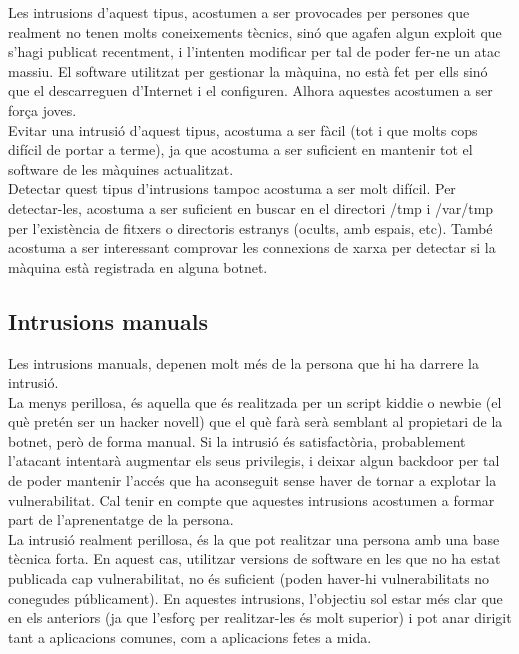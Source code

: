 Les intrusions d'aquest tipus, acostumen a ser provocades per persones que realment no tenen molts coneixements tècnics, sinó que 
agafen algun exploit que s'hagi publicat recentment, i l'intenten modificar per tal de poder fer-ne un atac massiu. El
software utilitzat per gestionar la màquina, no està fet per ells sinó que el descarreguen d'Internet i el configuren. Alhora
aquestes acostumen a ser força joves. \\

Evitar una intrusió d'aquest tipus, acostuma a ser fàcil (tot i que molts cops difícil de portar a terme), ja que 
acostuma a ser suficient en mantenir tot el software de les màquines actualitzat. \\

Detectar quest tipus d'intrusions tampoc acostuma a ser molt difícil. Per detectar-les, acostuma a ser suficient en buscar en el directori /tmp i /var/tmp
per l'existència de fitxers o directoris estranys (ocults, amb espais, etc). També acostuma a ser interessant comprovar 
les connexions de xarxa per detectar si la màquina està registrada en alguna botnet. \\

\subsection{Intrusions manuals}

Les intrusions manuals, depenen molt més de la persona que hi ha darrere la intrusió. \\

La menys perillosa, és aquella que és realitzada per un script kiddie o newbie (el què pretén ser un hacker novell) que 
el què farà serà semblant al propietari de la botnet, però de forma manual. Si la intrusió és satisfactòria, probablement
l'atacant intentarà augmentar els seus privilegis, i deixar algun backdoor per tal de poder mantenir l'accés que ha aconseguit
sense haver de tornar a explotar la vulnerabilitat. Cal tenir en compte que aquestes intrusions acostumen a formar part
de l'aprenentatge de la persona. \\

La intrusió realment perillosa, és la que pot realitzar una persona amb una base tècnica forta. En aquest cas, utilitzar
versions de software en les que no ha estat publicada cap vulnerabilitat, no és suficient (poden haver-hi vulnerabilitats
no conegudes públicament). En aquestes intrusions, l'objectiu sol estar més clar que en els anteriors (ja que 
l'esforç per realitzar-les és molt superior) i pot anar dirigit tant a aplicacions comunes, com a aplicacions fetes a mida. \\


